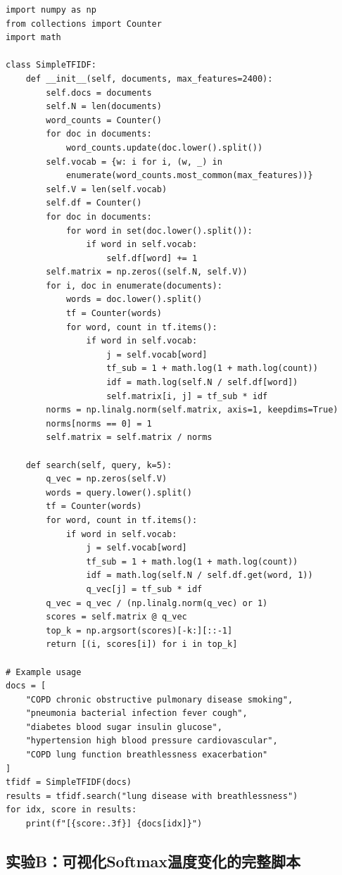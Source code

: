 \documentclass[11pt,a4paper]{ctexart}
\begin{document}
\begin{verbatim}
import numpy as np
from collections import Counter
import math

class SimpleTFIDF:
    def __init__(self, documents, max_features=2400):
        self.docs = documents
        self.N = len(documents)
        word_counts = Counter()
        for doc in documents:
            word_counts.update(doc.lower().split())
        self.vocab = {w: i for i, (w, _) in
            enumerate(word_counts.most_common(max_features))}
        self.V = len(self.vocab)
        self.df = Counter()
        for doc in documents:
            for word in set(doc.lower().split()):
                if word in self.vocab:
                    self.df[word] += 1
        self.matrix = np.zeros((self.N, self.V))
        for i, doc in enumerate(documents):
            words = doc.lower().split()
            tf = Counter(words)
            for word, count in tf.items():
                if word in self.vocab:
                    j = self.vocab[word]
                    tf_sub = 1 + math.log(1 + math.log(count))
                    idf = math.log(self.N / self.df[word])
                    self.matrix[i, j] = tf_sub * idf
        norms = np.linalg.norm(self.matrix, axis=1, keepdims=True)
        norms[norms == 0] = 1
        self.matrix = self.matrix / norms

    def search(self, query, k=5):
        q_vec = np.zeros(self.V)
        words = query.lower().split()
        tf = Counter(words)
        for word, count in tf.items():
            if word in self.vocab:
                j = self.vocab[word]
                tf_sub = 1 + math.log(1 + math.log(count))
                idf = math.log(self.N / self.df.get(word, 1))
                q_vec[j] = tf_sub * idf
        q_vec = q_vec / (np.linalg.norm(q_vec) or 1)
        scores = self.matrix @ q_vec
        top_k = np.argsort(scores)[-k:][::-1]
        return [(i, scores[i]) for i in top_k]

# Example usage
docs = [
    "COPD chronic obstructive pulmonary disease smoking",
    "pneumonia bacterial infection fever cough",
    "diabetes blood sugar insulin glucose",
    "hypertension high blood pressure cardiovascular",
    "COPD lung function breathlessness exacerbation"
]
tfidf = SimpleTFIDF(docs)
results = tfidf.search("lung disease with breathlessness")
for idx, score in results:
    print(f"[{score:.3f}] {docs[idx]}")
\end{verbatim}

\subsection*{实验B：可视化Softmax温度变化的完整脚本}
\end{document}
